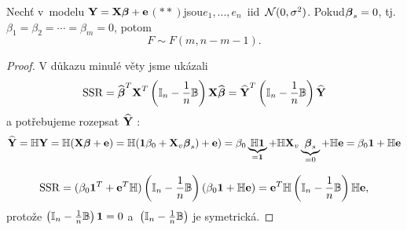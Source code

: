 \begin{theorem}
Nechť v~modelu $\Y = \X \betab + \eb$$ (**) $jsou$ e_1,..., e_n $~iid~$ \Nn $. Pokud$ \betab_s = 0 $, tj.$ \beta_1 = \beta_2 = \cdots = \beta_m = 0 $, potom
 $$
F \sim F(m, n - m -1).
 $$
\end{theorem}

\begin{proof}
V důkazu minulé věty jsme ukázali
 $$
\SSR = \wbetab^T \X^T \left(\Identita{n} - \lomn{1} \Bm \right) \X \wbetab = \hYb^T \left(\Identita{n} - \lomn{1} \Bm \right) \hYb
 $$
a potřebujeme rozepsat $\hYb$ :
 $$
\hYb = \Hm \Y = \Hm (\X \betab + \eb) = \Hm (\jednab \beta_0 + \X_v \betab_s)+ \eb) = \beta_0 \underbrace{\Hm \jednab}_{ = \jednab} + \Hm \X_v \underbrace{\betab_s}_{ = 0} + \Hm \eb = \beta_0 \jednab + \Hm \eb
 $$

 $$
\SSR = (\beta_0 \jednab^T + \eb^T \Hm)\left(\Identita{n} - \lomn{1} \Bm \right) (\beta_0 \jednab + \Hm \eb) = \eb^T \Hm \left(\Identita{n} - \lomn{1} \Bm \right) \Hm \eb,
 $$
protože $\left(\Identita{n} - \lomn{1} \Bm \right) \jednab = 0$ a~$\left(\Identita{n} - \lomn{1} \Bm \right)$ je symetrická.


\end{proof}
